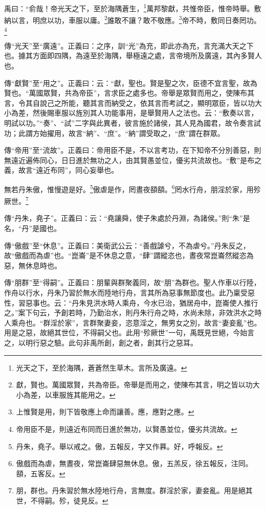禹曰：“俞哉！帝光天之下，至於海隅蒼生，\footnote{光天之下，至於海隅，蒼蒼然生草木。言所及廣遠。}萬邦黎獻，共惟帝臣，惟帝時舉。敷納以言，明庶以功，車服以庸。\footnote{獻，賢也。萬國眾賢，共為帝臣。帝舉是而用之，使陳布其言，明之皆以功大小為差，以車服旌其能用之。}誰敢不讓？敢不敬應。\footnote{上惟賢是用，則下皆敬應上命而讓善。應，應對之應。}帝不時，敷同日奏罔功。\footnote{帝用臣不是，則遠近布同而日進於無功，以賢愚並位，優劣共流故。}


{\noindent\zhuan{}\fzbyks 傳“光天”至“廣遠”。正義曰：之序，訓“光”為充，即此亦為充，言充滿大天之下也。據其方面即四隅，為遠至於海隅，舉極遠之處，言帝境所及廣遠，其內多賢人也。 \par}

{\noindent\zhuan{}\fzbyks 傳“獻賢”至“用之”。正義曰：云：“獻，聖也。賢是聖之次，臣德不宜言聖，故為賢也。“萬國眾賢，共為帝臣”，言求臣之處多也。帝舉是眾賢而用之，使陳布其言，令其自說己之所能，聽其言而納受之，依其言而考試之，顯明眾臣，皆以功大小為差，然後賜車服以旌別其人功能事用，是舉賢用人之法也。云：“敷奏以言，明試以功。”“奏”、“試”二字與此異者，彼言施於諸侯，其人見為國君，故令奏言試功；此謂方始擢用，故言“納”、“庶”。“納”謂受取之，“庶”謂在群眾。 \par}

{\noindent\zhuan{}\fzbyks 傳“帝用”至“流故”。正義曰：帝用臣不是，不以言考功，在下知帝不分別善惡，則無遠近遍佈同心，日日進於無功之人，由其賢愚並位，優劣共流故也。“敷”是布之義，故言“遠近布同”，同心妄舉也。 \par}

無若丹朱傲，惟慢遊是好。\footnote{丹朱，堯子。舉以戒之。傲，五報反，字又作奡。好，呼報反。}傲虐是作，罔晝夜頟頟。\footnote{傲戲而為虐，無晝夜，常崑崙肆惡無休息。傲，五羔反，徐五報反，注同。頟，五客反。}罔水行舟，朋淫於家，用殄厥世。\footnote{朋，群也。丹朱習於無水陸地行舟，言無度。群淫於家，妻妾亂。用是絕其世，不得嗣。殄，徒見反。}


{\noindent\zhuan{}\fzbyks 傳“丹朱，堯子”。正義曰：云：“堯讓舜，使子朱處於丹淵，為諸侯。”則“朱”是名，“丹”是國也。 \par}

{\noindent\zhuan{}\fzbyks 傳“傲戲”至“休息”。正義曰：美衛武公云：“善戲謔兮，不為虐兮。”丹朱反之，故“傲戲而為虐”也。“崑崙”是不休息之意，“肆”謂縱恣也，晝夜常崑崙然縱恣為惡，無休息時也。 \par}

{\noindent\zhuan{}\fzbyks 傳“朋群”至“得嗣”。正義曰：朋輩與群聚義同，故“朋”為群也。聖人作車以行陸，作舟以行水，丹朱乃習於無水而陸地行舟，言其所為惡事無節度也。此乃稟受惡性，習惡事也。云：“丹朱見洪水時人乘舟，今水已治，猶居舟中，崑崙使人推行之。”案下句云，予創若時，乃勤治水，則丹朱行舟之時，水尚未除，非效洪水之時人乘舟也。“群淫於家”，言群聚妻妾，恣意淫之，無男女之別，故言“妻妾亂”也。用是之惡，故絕其世位，不得嗣父也。此用“殄厥世”一句，禹既見世絕，今始言之，以明行惡之驗。此句非禹所創，創之者，創其行之惡耳。 \par}

